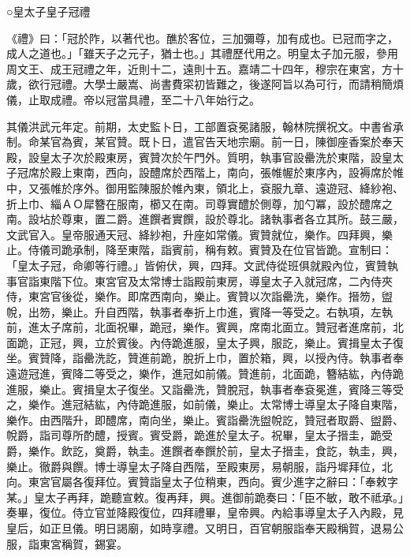 ○皇太子皇子冠禮

《禮》曰：「冠於阼，以著代也。醮於客位，三加彌尊，加有成也。已冠而字之，成人之道也。」「雖天子之元子，猶士也。」其禮歷代用之。明皇太子加元服，參用周文王、成王冠禮之年，近則十二，遠則十五。嘉靖二十四年，穆宗在東宮，方十歲，欲行冠禮。大學士嚴嵩、尚書費寀初皆難之，後遂阿旨以為可行，而請稍簡煩儀，止取成禮。帝以冠當具禮，至二十八年始行之。

其儀洪武元年定。前期，太史監卜日，工部置袞冕諸服，翰林院撰祝文。中書省承制。命某官為賓，某官贊。既卜日，遣官告天地宗廟。前一日，陳御座香案於奉天殿，設皇太子次於殿東房，賓贊次於午門外。質明，執事官設罍洗於東階，設皇太子冠席於殿上東南，西向，設醴席於西階上，南向，張帷幄於東序內，設褥席於帷中，又張帷於序外。御用監陳服於帷內東，領北上，袞服九章、遠遊冠、絳紗袍、折上巾、緇ＡＯ犀簪在服南，櫛又在南。司尊實醴於側尊，加勺冪，設於醴席之南。設坫於尊東，置二爵。進饌者實饌，設於尊北。諸執事者各立其所。鼓三嚴，文武官入。皇帝服通天冠、絳紗袍，升座如常儀。賓贊就位，樂作。四拜興，樂止。侍儀司跪承制，降至東階，詣賓前，稱有敕。賓贊及在位官皆跪。宣制曰：「皇太子冠，命卿等行禮。」皆俯伏，興，四拜。文武侍從班俱就殿內位，賓贊執事官詣東階下位。東宮官及太常博士詣殿前東房，導皇太子入就冠席，二內侍夾侍，東宮官後從，樂作。即席西南向，樂止。賓贊以次詣罍洗，樂作。搢笏，盥帨，出笏，樂止。升自西階，執事者奉折上巾進，賓降一等受之。右執項，左執前，進太子席前，北面祝畢，跪冠，樂作。賓興，席南北面立。贊冠者進席前，北面跪，正冠，興，立於賓後。內侍跪進服，皇太子興，服訖，樂止。賓揖皇太子復坐。賓贊降，詣罍洗訖，贊進前跪，脫折上巾，置於箱，興，以授內侍。執事者奉遠遊冠進，賓降二等受之，樂作，進冠如前儀。贊進前，北面跪，簪結紘，內侍跪進服，樂止。賓揖皇太子復坐。又詣罍洗，贊脫冠，執事者奉袞冕進，賓降三等受之，樂作。進冠結紘，內侍跪進服，如前儀，樂止。太常博士導皇太子降自東階，樂作。由西階升，即醴席，南向坐，樂止。賓詣罍洗盥帨訖，贊冠者取爵、盥爵、帨爵，詣司尊所酌醴，授賓。賓受爵，跪進於皇太子。祝畢，皇太子搢圭，跪受爵，樂作。飲訖，奠爵，執圭。進饌者奉饌於前，皇太子搢圭，食訖，執圭，興，樂止。徹爵與饌。博士導皇太子降自西階，至殿東房，易朝服，詣丹墀拜位，北向。東宮官屬各復拜位。賓贊詣皇太子位稍東，西向。賓少進字之辭曰：「奉敕字某。」皇太子再拜，跪聽宣敕。復再拜，興。進御前跪奏曰：「臣不敏，敢不祗承。」奏畢，復位。侍立官並降殿復位，四拜禮畢，皇帝興。內給事導皇太子入內殿，見皇后，如正旦儀。明日謁廟，如時享禮。又明日，百官朝服詣奉天殿稱賀，退易公服，詣東宮稱賀，錫宴。

